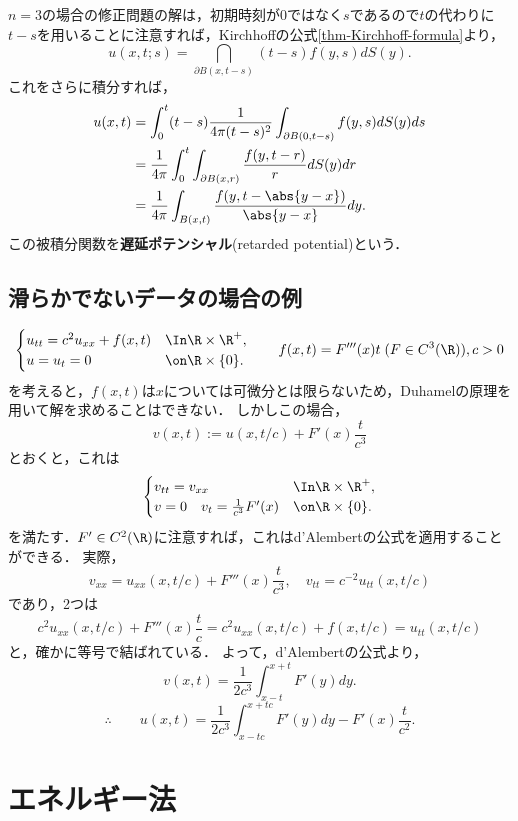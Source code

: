 \documentclass[uplatex,dvipdfmx]{jsreport}
\begin{document}
\begin{example}[$n=3$の場合の解]
    $n=3$の場合の修正問題の解は，初期時刻が$0$ではなく$s$であるので$t$の代わりに$t-s$を用いることに注意すれば，Kirchhoffの公式\ref{thm-Kirchhoff-formula}より，
    \[u(x,t;s)=\dint_{\partial B(x,t-s)}(t-s)f(y,s)dS(y).\]
    これをさらに積分すれば，
    \begin{align*}
        u(x,t)&=\int^t_0(t-s)\frac{1}{4\pi(t-s)^2}\int_{\partial B(0,t-s)}f(y,s)dS(y)ds\\
        &=\frac{1}{4\pi}\int^t_0\int_{\partial B(x,r)}\frac{f(y,t-r)}{r}dS(y)dr\\
        &=\frac{1}{4\pi}\int_{B(x,t)}\frac{f(y,t-\abs{y-x})}{\abs{y-x}}dy.
    \end{align*}
    この被積分関数を\textbf{遅延ポテンシャル}(retarded potential)という．
\end{example}

\subsection{滑らかでないデータの場合の例}

\begin{example}
    \[\begin{cases}
        u_{tt}=c^2u_{xx}+f(x,t)&\In\R\times\R^+,\\
        u=u_t=0&\on\R\times\{0\}.
    \end{cases}\qquad f(x,t)=F'''(x)t\;(F\in C^3(\R)),c>0\]
    を考えると，$f(x,t)$は$x$については可微分とは限らないため，Duhamelの原理を用いて解を求めることはできない．
    しかしこの場合，
    \[v(x,t):=u(x,t/c)+F'(x)\frac{t}{c^3}\]
    とおくと，これは
    \[\begin{cases}
        v_{tt}=v_{xx}&\In\R\times\R^+,\\
        v=0\quad v_t=\frac{1}{c^3}F'(x)&\on\R\times\{0\}.
    \end{cases}\]
    を満たす．$F'\in C^2(\R)$に注意すれば，これはd'Alembertの公式を適用することができる．
    実際，
    \[v_{xx}=u_{xx}(x,t/c)+F'''(x)\frac{t}{c^3},\quad v_{tt}=c^{-2}u_{tt}(x,t/c)\]
    であり，2つは
    \[c^2u_{xx}(x,t/c)+F'''(x)\frac{t}{c}=c^2u_{xx}(x,t/c)+f(x,t/c)=u_{tt}(x,t/c)\]
    と，確かに等号で結ばれている．
    よって，d'Alembertの公式より，
    \[v(x,t)=\frac{1}{2c^3}\int^{x+t}_{x-t}F'(y)dy.\]
    \[\therefore\qquad u(x,t)=\frac{1}{2c^3}\int^{x+tc}_{x-tc}F'(y)dy-F'(x)\frac{t}{c^2}.\]
\end{example}

\section{エネルギー法}
\end{document}
